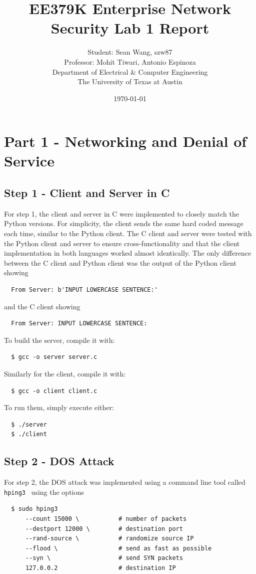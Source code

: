 \documentclass[11pt]{article}
\author{Student: Sean Wang, szw87 \\ Professor: Mohit Tiwari, Antonio Espinoza \\ Department of Electrical \& Computer Engineering \\ The University of Texas at Austin}
\date{\today}
\title{EE379K Enterprise Network Security Lab 1 Report}
\begin{document}
\maketitle
\section*{Part 1 - Networking and Denial of Service}
\subsection*{Step 1 - Client and Server in C}
For step 1, the client and server in C were implemented to closely match the Python versions.
For simplicity, the client sends the same hard coded message each time, similar to the Python
client. The C client and server were tested with the Python client and server to ensure
cross-functionality and that the client implementation in both languages worked almost
identically. The only difference between the C client and Python client was the output of the
Python client showing
\begin{verbatim}
  From Server: b'INPUT LOWERCASE SENTENCE:'
\end{verbatim}
and the C client showing
\begin{verbatim}
  From Server: INPUT LOWERCASE SENTENCE:
\end{verbatim}
To build the server, compile it with:
\begin{verbatim}
  $ gcc -o server server.c
\end{verbatim}
Similarly for the client, compile it with:
\begin{verbatim}
  $ gcc -o client client.c
\end{verbatim}
To run them, simply execute either:
\begin{verbatim}
  $ ./server
  $ ./client
\end{verbatim}
\subsection*{Step 2 - DOS Attack}
For step 2, the DOS attack was implemented using a command line tool called \verb|hping3|~\cite{hping3}
using the options
\begin{verbatim}
  $ sudo hping3
      --count 15000 \           # number of packets
      --destport 12000 \        # destination port
      --rand-source \           # randomize source IP
      --flood \                 # send as fast as possible
      --syn \                   # send SYN packets
      127.0.0.2                 # destination IP
\end{verbatim}
\end{document}
